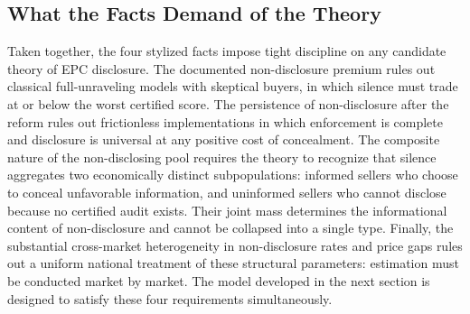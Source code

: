 \subsection{What the Facts Demand of the Theory}
\label{ss:facts_demand}

Taken together, the four stylized facts impose tight discipline on any candidate theory of EPC disclosure. The documented non-disclosure premium rules out classical full-unraveling models with skeptical buyers, in which silence must trade at or below the worst certified score. The persistence of non-disclosure after the reform rules out frictionless implementations in which enforcement is complete and disclosure is universal at any positive cost of concealment. The composite nature of the non-disclosing pool requires the theory to recognize that silence aggregates two economically distinct subpopulations: informed sellers who choose to conceal unfavorable information, and uninformed sellers who cannot disclose because no certified audit exists. Their joint mass determines the informational content of non-disclosure and cannot be collapsed into a single type. Finally, the substantial cross-market heterogeneity in non-disclosure rates and price gaps rules out a uniform national treatment of these structural parameters: estimation must be conducted market by market. The model developed in the next section is designed to satisfy these four requirements simultaneously.
